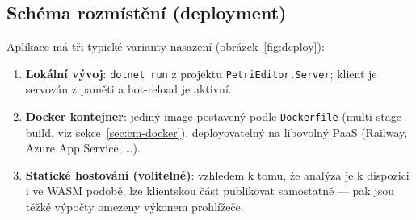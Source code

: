 \documentclass[12pt,a4paper]{article}
\begin{document}
\subsection{Schéma rozmístění (deployment)}

Aplikace má tři typické varianty nasazení (obrázek~\ref{fig:deploy}):

\begin{enumerate}
    \item \textbf{Lokální vývoj}: \texttt{dotnet run} z projektu
          \texttt{PetriEditor.Server}; klient je servován z paměti
          a hot-reload je aktivní.
    \item \textbf{Docker kontejner}: jediný image postavený podle
          \texttt{Dockerfile} (multi-stage build, viz sekce~\ref{sec:cm-docker}),
          deployovatelný na libovolný PaaS (Railway, Azure App Service, \dots).
    \item \textbf{Statické hostování (volitelné)}: vzhledem k tomu, že
          analýza je k dispozici i ve WASM podobě, lze klientskou část
          publikovat samostatně — pak jsou těžké výpočty omezeny výkonem
          prohlížeče.
\end{enumerate}
\end{document}
